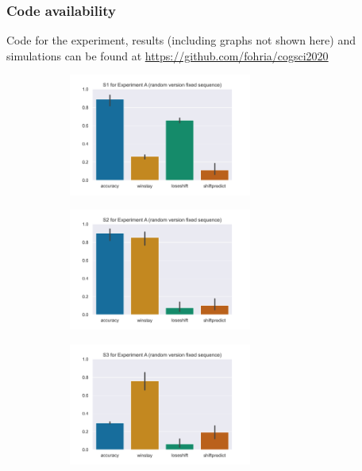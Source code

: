 \documentclass[10pt,letterpaper]{article}
\begin{document}
\subsubsection{Code availability} Code for the experiment, results (including graphs not shown here) and simulations can be found at \url{https://github.com/fohria/cogsci2020}


\begin{figure}[t]
\centering
\captionsetup{justification=centering}

\begin{subfigure}{0.33\textwidth}
\includegraphics[width=0.9\linewidth, height=4cm]{plots/expA_s1.png} 
\label{fig:expA1}
\end{subfigure}
\begin{subfigure}{0.33\textwidth}
\includegraphics[width=0.9\linewidth, height=4cm]{plots/expA_s2.png}
\label{fig:expA2}
\end{subfigure}
\begin{subfigure}{0.33\textwidth}
\includegraphics[width=0.9\linewidth, height=4cm]{plots/expA_s3.png}
\label{fig:expA3}
\end{subfigure}


\end{figure}
\end{document}
